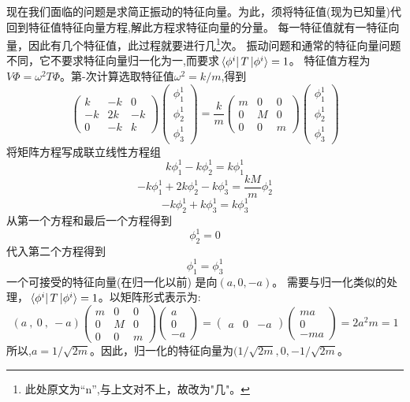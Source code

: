 现在我们面临的问题是求简正振动的特征向量。为此，须将特征值(现为已知量)代回到特征值特征向量方程,解此方程求特征向量的分量。
每一特征值就有一特征向量，因此有几个特征值，此过程就要进行几\footnote{此处原文为“n”,与上文对不上，故改为"几"。}次。
振动问题和通常的特征向量问题不同，它不要求特征向量归一化为一,而要求$\bra*{\phi^i}T\ket*{\phi^i}=1$。
特征值方程为$V\Phi=\omega^2T\Phi$。第-次计算选取特征值$\omega^2=k/m$,得到
\[
\begin{pmatrix}
    k & -k & 0 \\
    -k & 2k & -k \\
    0 & -k & k
\end{pmatrix}    
\begin{pmatrix}
    \phi^1_1 \\ \phi^1_2 \\ \phi^1_3
\end{pmatrix}
=\frac{k}{m}
\begin{pmatrix}
    m & 0 & 0 \\
    0 & M & 0 \\
    0 & 0 & m
\end{pmatrix} 
\begin{pmatrix}
    \phi^1_1 \\ \phi^1_2 \\ \phi^1_3
\end{pmatrix}  
\]
将矩阵方程写成联立线性方程组
\[k\phi_1^1-k\phi_2^1=k\phi_1^1\]
\[-k\phi_1^1+2k\phi_2^1-k\phi_3^1=\frac{kM}{m}\phi^1_2\]
\[-k\phi_2^1+k\phi_3^1=k\phi_3^1\]
从第一个方程和最后一个方程得到
\[\phi^1_2=0\]
代入第二个方程得到
\[\phi_1^1=\phi_3^1\]
一个可接受的特征向量(在归一化以前) 是向$(a,0,-a)$。
需要与归一化类似的处理，$\bra*{\phi^i}T\ket*{\phi^i}=1$。以矩阵形式表示为:
\[
(a \ , \ 0 \ , \ -a) 
\begin{pmatrix}
    m & 0 & 0 \\
    0 & M & 0 \\
    0 & 0 & m
\end{pmatrix}
\begin{pmatrix}
    a \\ 0 \\ -a
\end{pmatrix}  
=  
\begin{pmatrix}
    a & 0 & -a
\end{pmatrix} 
\begin{pmatrix}
    ma \\ 0 \\ -ma
\end{pmatrix}  
=2a^2m=1
\]
所以,$a=1/\sqrt{2m}$。因此，归一化的特征向量为$(1/\sqrt{2m},0,-1/\sqrt{2m}$。

